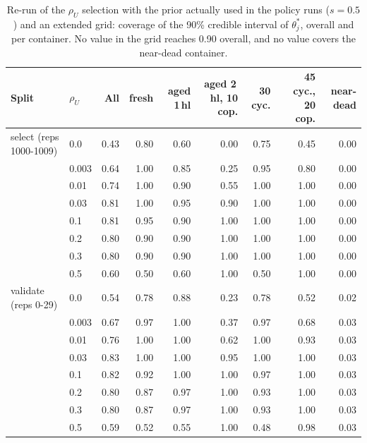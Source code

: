 \begin{table}[!t]
\centering
\caption{Re-run of the $\rho_U$ selection with the prior actually used in the policy runs ($s{=}0.5$) and an extended grid: coverage of the 90\% credible interval of $\theta^\ast_j$, overall and per container.  No value in the grid reaches 0.90 overall, and no value covers the near-dead container.}
\label{tab:r4calib}
\scriptsize
\setlength{\tabcolsep}{2.5pt}
\begin{tabular}{@{}llrrrrrrr@{}}
\toprule
Split & $\rho_U$ & All & fresh & aged 1\,hl & aged 2\,hl, 10 cop. & 30 cyc. & 45 cyc., 20 cop. & near-dead \\
\midrule
select (reps 1000-1009) & 0.0 & 0.43 & 0.80 & 0.60 & 0.00 & 0.75 & 0.45 & 0.00 \\
 & 0.003 & 0.64 & 1.00 & 0.85 & 0.25 & 0.95 & 0.80 & 0.00 \\
 & 0.01 & 0.74 & 1.00 & 0.90 & 0.55 & 1.00 & 1.00 & 0.00 \\
 & 0.03 & 0.81 & 1.00 & 0.95 & 0.90 & 1.00 & 1.00 & 0.00 \\
 & 0.1 & 0.81 & 0.95 & 0.90 & 1.00 & 1.00 & 1.00 & 0.00 \\
 & 0.2 & 0.80 & 0.90 & 0.90 & 1.00 & 1.00 & 1.00 & 0.00 \\
 & 0.3 & 0.80 & 0.90 & 0.90 & 1.00 & 1.00 & 1.00 & 0.00 \\
 & 0.5 & 0.60 & 0.50 & 0.60 & 1.00 & 0.50 & 1.00 & 0.00 \\
\midrule
validate (reps 0-29) & 0.0 & 0.54 & 0.78 & 0.88 & 0.23 & 0.78 & 0.52 & 0.02 \\
 & 0.003 & 0.67 & 0.97 & 1.00 & 0.37 & 0.97 & 0.68 & 0.03 \\
 & 0.01 & 0.76 & 1.00 & 1.00 & 0.62 & 1.00 & 0.93 & 0.03 \\
 & 0.03 & 0.83 & 1.00 & 1.00 & 0.95 & 1.00 & 1.00 & 0.03 \\
 & 0.1 & 0.82 & 0.92 & 1.00 & 1.00 & 0.97 & 1.00 & 0.03 \\
 & 0.2 & 0.80 & 0.87 & 0.97 & 1.00 & 0.93 & 1.00 & 0.03 \\
 & 0.3 & 0.80 & 0.87 & 0.97 & 1.00 & 0.93 & 1.00 & 0.03 \\
 & 0.5 & 0.59 & 0.52 & 0.55 & 1.00 & 0.48 & 0.98 & 0.03 \\
\bottomrule
\end{tabular}
\end{table}
